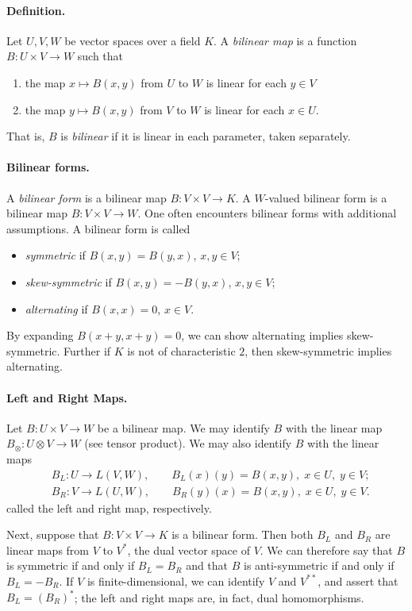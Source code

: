 \documentclass{article}
\begin{document}
\paragraph{Definition.}
Let $U,V,W$ be vector spaces over a field $K$.  A  \emph{bilinear map}
is a function $B: U
\times V \to W$ such that 
\begin{enumerate}
\item the map $x \mapsto B(x,y)$ from $U$ to $W$ is linear for each $y
  \in V$
\item the map $y \mapsto B(x,y)$ from $V$ to $W$ is linear for each $x
  \in U$.
\end{enumerate}
That is, $B$ is \emph{bilinear} if it is linear in each parameter,
taken separately.  

\paragraph{Bilinear forms.}
A \emph{bilinear form} is a bilinear map $B:V\times V\to K$.  A
$W$-valued bilinear form is a bilinear map $B: V\times V\to W$.  One
often encounters bilinear forms with additional assumptions.  A
bilinear form is called
\begin{itemize}
\item \emph{symmetric} if $B(x,y) = B(y,x)$, $x,y \in V$;
\item \emph{skew-symmetric} if $B(x,y) = -B(y,x)$, $x,y \in V$;
\item \emph{alternating} if $B(x,x) = 0$, $x \in V$.
\end{itemize}
By expanding $B(x+y,x+y) = 0$, we can show alternating implies
skew-symmetric. Further if $K$ is not of characteristic $2$, then
skew-symmetric implies alternating.

\paragraph{Left and Right Maps.}
Let $B:U\times V\to W$ be a bilinear map. We may identify $B$ with the
linear map $B_\otimes: U\otimes V\to W$ (see tensor product).  We may
also identify $B$ with the linear maps
\begin{align*}
  & B_L:U\to L(V,W),\qquad B_L(x)(y) = B(x,y),\; x\in U,\; y\in V;\\
  & B_R:V\to L(U,W),\qquad B_R(y)(x) = B(x,y),\; x\in U,\; y\in V.
\end{align*}
called the left and right map, respectively.  

Next, suppose that $B:V\times V\to K$ is a bilinear form.  Then both
$B_L$ and $B_R$ are linear maps from $V$ to $V^*$, the dual vector
space of $V$. We can therefore say that $B$ is symmetric if and only
if $B_L = B_R$ and that $B$ is anti-symmetric if and only if
$B_L=-B_R$.  If $V$ is finite-dimensional, we can identify $V$ and
$V^{**}$, and assert that $B_L=(B_R)^*$; the left and right maps are, in
fact, dual homomorphisms.
\end{document}
